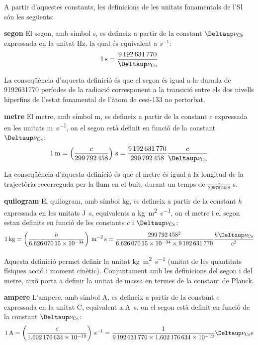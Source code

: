 A partir d'aquestes constants, les definicions de les unitats fonamentals de l'SI són les següents:
\begin{list}{}
   {\setlength{\labelwidth}{22mm} \setlength{\leftmargin}{22mm} \setlength{\labelsep}{2mm}}
   \item[\textbf{segon}] El segon, amb símbol s, es defineix a partir de la constant $\Deltaup\nu\ped{Cs}$ expressada en la unitat Hz, la qual és equivalent a $\si{s^{-1}}$:
       \[
            \SI{1}{s} = \frac{\num{9192631770}}{\Deltaup\nu\ped{Cs}}
       \]

    La conseqüència d'aquesta definició és que el segon és igual a la durada de \num{9192631770} períodes de la
   radiació corresponent a la transició entre els dos nivells
  hiperfins de l'estat fonamental de l'àtom de cesi-133 no pertorbat.

   \item[\textbf{metre}]  El metre, amb símbol m, es defineix a partir de la constant $c$ expressada en les unitats \si{m.s^{-1}}, on el segon està definit en funció de la constant  $\Deltaup\nu\ped{Cs}$:
       \[
            \SI{1}{m} = \left(\frac{c}{\num{299792458}}\right)\si{\,s} = \frac{\num{9192631770}}{\num{299792458}}\frac{c}{\Deltaup\nu\ped{Cs}}
       \]

    La conseqüència d'aquesta definició és que el metre és igual a la longitud de la trajectòria recorreguda per la llum
   en el buit, durant un temps de $\frac{1}{\num{299792458}}$ s.

   \item[\textbf{quilogram}] El quilogram, amb símbol kg, es defineix a partir de la constant $h$ expressada en les unitats \si{J.s}, equivalents a \si{kg.m^2.s^{-1}}, on el metre i el segon estan definits en funció de les constants $c$ i $\Deltaup\nu\ped{Cs}$:
       \[
            \SI{1}{kg} = \left(\frac{h}{\num{6,62607015 e-34}}\right)\si{\,m^{-2}.s} = \frac{\num{299792458}^2}{\num{6,62607015 e-34}\times\num{9192631770}}\frac{h\Deltaup\nu\ped{Cs}}{c^2}
       \]

   Aquesta definició permet definir la unitat \si{kg.m^2.s^{-1}} (unitat de les quantitats físiques acció i moment cinètic). Conjuntament amb les definicions del segon i del metre, això porta a definir la unitat de massa en termes de la constant de Planck.


   \item[\textbf{ampere}] L'ampere, amb símbol A, es defineix a partir de la constant $e$ expressada en la unitat C,  equivalent a \si{A.s}, on el segon està definit en funció de la constant  $\Deltaup\nu\ped{Cs}$:
       \[
            \SI{1}{A} = \left(\frac{e}{\num{1,602176634 e-19}}\right)\si{\,s^{-1}} = \frac{1}{\num{9192631770}\times\num{1,602176634 e-19}} \Deltaup\nu\ped{Cs} e
       \]


\end{list}
